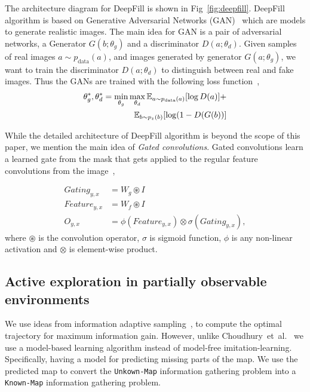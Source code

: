 The architecture diagram for DeepFill is shown in Fig~\ref{fig:deepfill}.
DeepFill algorithm is based on Generative Adversarial Networks
(GAN)~\cite{goodfellow2014GAN} which are models to generate realistic images.
The main idea for GAN is a pair of adversarial networks, a Generator $G(b;
\theta_g)$ and a discriminator $D(a; \theta_d)$.
Given samples of real images $a \sim p_{\text{data}}(a)$, and images generated by
generator $G(a; \theta_g)$, we want to train the discriminator $D(a; \theta_d)$
to distinguish between real and fake images. Thus the GANs are trained with the
following loss function~\cite{goodfellow2014GAN},
%
\begin{align}
  \theta^*_g, \theta^*_d = \min_{\theta_g} \max_{\theta_d} \mathbb{E}_{a \sim p_{\text{data}}(a)}[\log D(a)]
  + \nonumber \\  \mathbb{E}_{b \sim p_z(b)} [\log(1-D(G(b))]
\end{align}%
% 

While the detailed architecture of DeepFill algorithm is beyond the scope of this
paper, we mention the main idea of \textit{Gated convolutions}. Gated convolutions learn a
learned gate from the mask that gets applied to the regular feature convolutions
from the image~\cite{yu2018DeepFill},

%
\begin{align}
  \textit{Gating}_{y,x} &=  W_g \circledast I 
  \\
  \textit{Feature}_{y,x} &=  W_f \circledast I 
  \\
  O_{y,x} &= \phi(\textit{Feature}_{y,x}) \otimes \sigma(\textit{Gating}_{y,x}),
\end{align}%
% 
where $\circledast$ is the convolution operator, $\sigma$ is sigmoid function,
$\phi$ is any non-linear activation and $\otimes$ is element-wise product.


% 
\subsection{Active exploration in partially observable  environments}

We use ideas from information adaptive sampling~\cite{choudhury2017adaptive},
to compute the optimal trajectory for maximum information gain. However, unlike
Choudhury~et~al.~\cite{choudhury2017adaptive} we use a model-based learning
algorithm instead of model-free imitation-learning.
Specifically, having a model for predicting missing parts of the map.
We use the predicted map to convert the \texttt{Unkown-Map} information
gathering problem into a \texttt{Known-Map} information gathering problem.